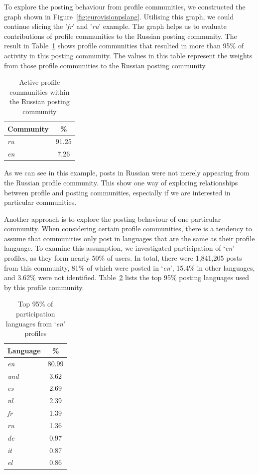 To explore the posting behaviour from profile communities, we
constructed the graph shown in
Figure~\ref{fig:eurovisionpslang}. Utilising this graph, we could
continue slicing the '{\emph{fr}}' and '{\emph{ru}}' example.  The
graph helps us to evaluate contributions of profile communities to the
Russian posting community.  The result in Table~\ref{tbl:russian}
shows profile communities that resulted in more than 95\% of activity
in this posting community. The values in this table represent the
weights from those profile communities to the Russian posting
community.

\begin{table}[!htb]
\centering
\begin{tabular}{@{}lc}
\toprule
\textbf{Community} & \textbf{\%} \\ 
\midrule
{\emph{ru}} & 91.25 \\
{\emph{en}} & 7.26 \\
\bottomrule
\end{tabular}
\caption{Active profile communities within the Russian posting community}
\label{tbl:russian}
\end{table}

As we can see in this example, posts in Russian were not merely
appearing from the Russian profile community. This show one way of
exploring relationships between profile and posting communities,
especially if we are interested in particular communities.

Another approach is to explore the posting behaviour of one particular
community. When considering certain profile communities, there is a
tendency to assume that communities only post in languages that are
the same as their profile language. To examine this assumption, we
investigated participation of `{\emph{en}}' profiles, as they form
nearly 50\% of users. In total, there were 1,841,205 posts from this
community, 81\% of which were posted in `{\emph{en}}', 15.4\% in other
languages, and 3.62\% were not identified. Table~\ref{tbl:enpartlangs}
lists the top 95\% posting languages used by this profile community.

\begin{table}[!htb]
\centering
\begin{tabular}{@{}lc}
\toprule
\textbf{Language} & \textbf{\%} \\ 
\midrule
{\emph{en}} & 80.99 \\
{\emph{und}} & 3.62 \\
{\emph{es}} & 2.69 \\
{\emph{nl}} & 2.39 \\
{\emph{fr}} & 1.39 \\
{\emph{ru}} & 1.36 \\
{\emph{de}} & 0.97 \\
{\emph{it}} & 0.87 \\ 
{\emph{el}} & 0.86 \\ 
\bottomrule
\end{tabular}
\caption{Top 95\% of participation languages from `{\emph{en}}' profiles}
\label{tbl:enpartlangs}
\end{table}

